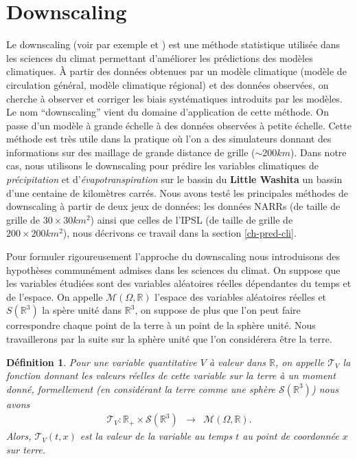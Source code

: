 \documentclass[a4paper,10pt]{article}
\newtheorem{definition}{Définition}
\begin{document}
\section{Downscaling}
\label{dwnsc}
Le downscaling (voir par exemple \cite{vrac2012dynamical} et \cite{ayar2016intercomparison}) est une méthode statistique utilisée dans les sciences du climat permettant d'améliorer les prédictions des modèles climatiques. À partir des données obtenues par un modèle climatique (modèle de circulation général, modèle climatique régional) et des données observées, on cherche à observer et corriger les biais systématiques introduits par les modèles. Le nom ``downscaling'' vient du domaine d'application de cette méthode. On passe d'un modèle à grande échelle à des données observées à petite échelle. Cette méthode est très utile dans la pratique où l'on a des simulateurs donnant des informations sur des maillage de grande distance de grille ($\sim 200km$). Dans notre cas, nous utilisons le downscaling pour prédire les variables climatiques de \textit{précipitation} et d'\textit{évapotranspiration} sur le bassin du \textbf{Little Washita} un bassin d'une centaine de kilomètres carrés. Nous avons testé les principales méthodes de downscaling à partir de deux jeux de données: les données NARRs (de taille de grille de $30\times 30 km^2$) ainsi que celles de l'IPSL (de taille de grille de $200\times200 km^2$), nous décrivons ce travail dans la section \ref{ch-pred-cli}.

Pour formuler rigoureusement l'approche du downscaling nous introduisons des hypothèses communément admises dans les sciences du climat. On suppose que les variables étudiées sont des variables aléatoires réelles dépendantes du temps et de l'espace. On appelle $\mathcal{M}(\Omega,\mathbb{R})$ l'espace des variables aléatoires réelles et $S(\mathbb{R}^3)$ la spère unité dans $\mathbb{R}^3$, on suppose de plus que l'on peut faire correspondre chaque point de la terre à un point de la sphère unité. Nous travaillerons par la suite sur la sphère unité que l'on considérera être la terre.

\begin{definition}
	\label{terre}
	Pour une variable quantitative $V$ à valeur dans $\mathbb{R}$, on appelle $\mathcal{T}_V$ la fonction donnant les  valeurs réelles de cette variable sur la terre à un moment donné, formellement (en considérant la terre comme une sphère $\mathcal{S}(\mathbb{R}^3)$) nous avons
	\begin{equation}
		\begin{array}{ccc}
			\mathcal{T}_V: \mathbb{R}_{+}\times\mathcal{S}(\mathbb{R}^{3}) & \to & \mathcal{M}(\Omega,\mathbb{R}).
		\end{array}
	\end{equation}
	Alors, $\mathcal{T}_V(t,x)$ est la valeur de la variable au temps $t$ au point de coordonnée $x$ sur terre.	
\end{definition}
\end{document}
